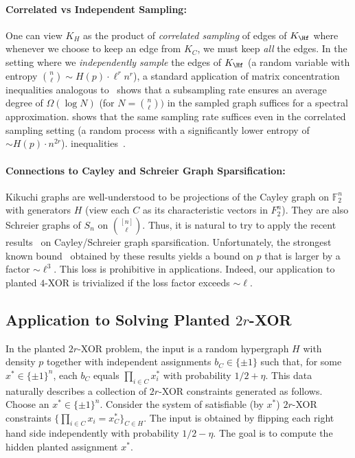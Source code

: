 \documentclass
[11pt,letterpaper]
{article}
\begin{document}
\paragraph{Correlated vs Independent Sampling:} One can view $K_H$ as the product of \emph{correlated sampling} of edges of $K_{\Hf}$ where whenever we choose to keep an edge from $K_C$, we must keep \emph{all} the edges. In the setting where we \emph{independently sample} the edges of $K_{\Hf}$ (a random variable with entropy ${n \choose \ell} \sim H(p) \cdot \ell^r n^r$), a standard application of matrix concentration inequalities analogous to~\cite{SpielmanSrivastava11} shows that a subsampling rate ensures an average degree of $\Omega(\log N)$ (for $N= {n \choose \ell})$ in the sampled graph suffices for a spectral approximation.  shows that the same sampling rate suffices even in the correlated sampling setting (a random process with a significantly lower entropy of $\sim H(p) \cdot n^{2r}$). 
inequalities~\cite{SpielmanSrivastava11}. 


\paragraph{Connections to Cayley and Schreier Graph Sparsification:} Kikuchi graphs are well-understood to be projections of the Cayley graph on $\mathbb{F}_2^n$  with generators $H$ (view each $C$ as its characteristic vectors in $F_2^n$). They are also Schreier graphs of $S_n$ on ${[n] \choose \ell}$. Thus, it is natural to try to apply the recent results~\cite{BasuKothariLiuMeka25,HsiehLeeMohantyPuttermanZhang25} on Cayley/Schreier graph sparsification. Unfortunately, the strongest known bound~\cite{BasuKothariLiuMeka25} obtained by these results yields a bound on $p$ that is larger by a factor $\sim \ell^3$. This loss is prohibitive in applications. Indeed, our application to planted $4$-XOR is trivialized if the loss factor exceeds $\sim \ell$. 







\subsection{Application to Solving Planted $2r$-XOR} In the planted $2r$-XOR problem, the input is a random hypergraph $H$ with density $p$ together with independent assignments $b_C \in \{\pm 1\}$ such that, for some $x^* \in \{ \pm 1\}^n$, each $b_C$ equals $\prod_{i \in C} x_i^*$ with probability $1/2 + \eta$. This data naturally describes a collection of $2r$-XOR constraints generated as follows. Choose an $x^* \in \{\pm 1\}^n$. Consider the system of satisfiable (by $x^*$) $2r$-XOR constraints $\{\prod_{i \in C} x_i = x^*_C\}_{C \in H}$. The input is obtained by flipping each right hand side independently with probability $1/2-\eta$. The goal is to compute the hidden planted assignment $x^*$. 
\end{document}
